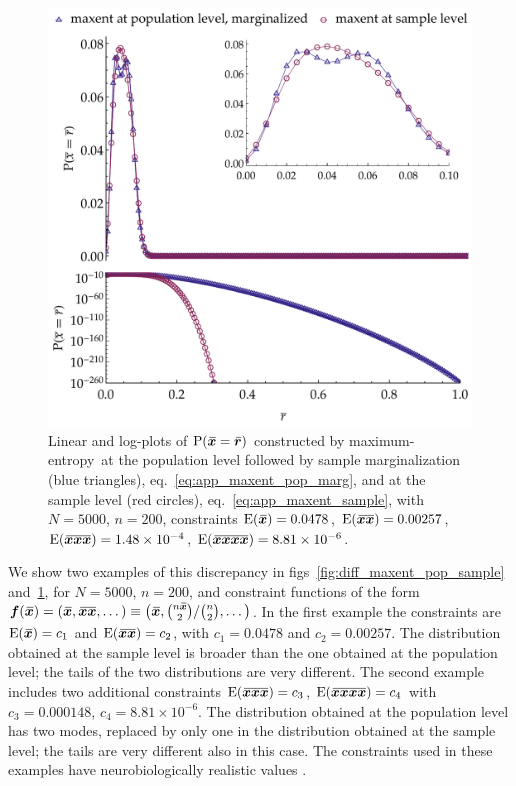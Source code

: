 \documentclass{article}
\theoremstyle{remark}
\theoremstyle{innote}
\newcommand*{\citep}{\parencites}
\renewcommand*{\cite}{\citep}
\renewcommand*{\|}{\mathpunct{|}}%
\newcommand*{\p}{\mathrm{P}}%
\newcommand*{\eqn}{eq.}%
\newcommand*{\figs}{figs}%
\newcommand*{\E}{\mathrm{E}}
\DeclarePairedDelimiter\expp{(}{)}
\newcommand*{\expe}{\E\expp}%
\theoremstyle{simple}
\newcommand*{\widebar}[1]{{\mkern1.5mu\skew{2}\overline{\mkern-1.5mu#1\mkern-1.5mu}\mkern 1.5mu}}
\newcommand*{\sav}{\widebar} %
\newcommand*{\yxx}{x}%
\newcommand*{\yx}{\bm{\yxx}}%
\newcommand*{\yxs}{\sav{\yx}}%
\newcommand*{\yxxs}{\sav{\yx\yx}}%
\newcommand*{\yr}{\bm{r}}%
\newcommand*{\yrs}{\sav{\yr}}%
\newcommand*{\yf}{\bm{f}}
\newcommand*{\me}{maximum-entropy}
\begin{document}
\begin{figure}[!t]
\centering
\includegraphics[width=0.99\linewidth]{different_maxent_pop_sample_200_realdata_4mom.pdf}
% 
\caption{Linear and log-plots of $\p(\yxs = \yrs)$ constructed by \me\ at
  the population level followed by sample marginalization (blue triangles),
  \eqn~\eqref{eq:app_maxent_pop_marg}, and at the sample level (red
  circles), \eqn~\eqref{eq:app_maxent_sample}, with $N=5000$,
  $n=200$, constraints $\expe{\yxs}=0.0478$, $\expe{\yxxs}=0.00257$,
  $\expe{\sav{\yx\yx\yx}}=1.48\times10^{-4}$,
  $\expe{\sav{\yx\yx\yx\yx}}=8.81\times 10^{-6}$.}
\label{fig:diff_maxent_pop_sample_realdata}
\end{figure}%
We show two examples of this discrepancy in
\figs~\ref{fig:diff_maxent_pop_sample}
and~\ref{fig:diff_maxent_pop_sample_realdata}, for $N=5000$, $n=200$, and
constraint functions of the form
$\yf(\yxs)=(\yxs,\yxxs,\dotsc)\equiv\bigl(
\yxs, \raisebox{0pt}[0pt][1ex]{}\binom{n\yxs}{2}/\binom{n}{2},\dotsc \bigr)$. In the first example the
constraints are $\expe{\yxs} = c_1$ and $\expe{\yxxs} = c_2$, with
$c_1=0.0478$ and $c_2=0.00257$. The distribution obtained at the sample
level is broader than the one obtained at the population level; the tails
of the two distributions are very different. The second example includes
two additional constraints $\expe{\sav{\yx\yx\yx}}= c_3$,
$\expe{\sav{\yx\yx\yx\yx}}=c_4$ with $c_3=0.000148$,
$c_4=8.81\times 10^{-6}$. The distribution obtained at the population level
has two modes, replaced by only one in the distribution obtained at the
sample level; the tails are very different also in this case. The
constraints used in these examples have neurobiologically realistic values
\cite{rostamietal2016}.
\end{document}

